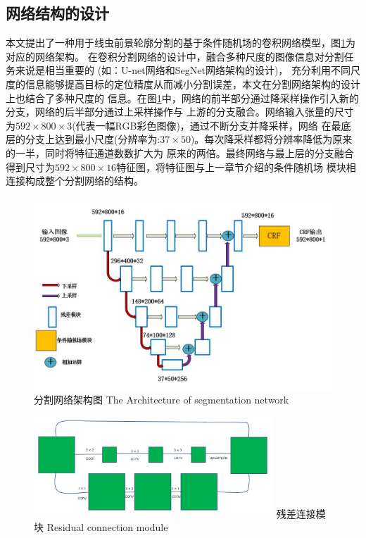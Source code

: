 \subsection{网络结构的设计}
\label{subsec:arch-design}
	本文提出了一种用于线虫前景轮廓分割的基于条件随机场的卷积网络模型，图\ref{fig:chap5:arch}为对应的网络架构。
	在卷积分割网络的设计中，融合多种尺度的图像信息对分割任务来说是相当重要的
	(如：U-net网络\cite{ronneberger2015u}和SegNet网络\cite{badrinarayanan2015segnet}架构的设计)，
	充分利用不同尺度的信息能够提高目标的定位精度从而减小分割误差，本文在分割网络架构的设计上也结合了多种尺度的
	信息。在图\ref{fig:chap5:arch}中，网络的前半部分通过降采样操作引入新的分支，网络的后半部分通过上采样操作与
	上游的分支融合。网络输入张量的尺寸为$592\times800\times3$(代表一幅RGB彩色图像)，通过不断分支并降采样，网络
	在最底层的分支上达到最小尺度(分辨率为:$37\times50$)。每次降采样都将分辨率降低为原来的一半，同时将特征通道数数扩大为
	原来的两倍。最终网络与最上层的分支融合得到尺寸为$592\times800\times16$特征图，将特征图与上一章节介绍的条件随机场
	模块相连接构成整个分割网络的结构。
	\begin{figure}[thb]
	  \centering
	  \includegraphics[width=13cm]{figure/chap5/arch.jpg}
	  \bicaption
		{分割网络架构图}
		{The Architecture of segmentation network}
	  \label{fig:chap5:arch}
	\end{figure}
	\begin{figure}[htb]
	  \centering
	  \includegraphics[width=9cm]{figure/chap4/residualpooling.jpg}
	  \bicaption
		{残差连接模块}
		{Residual connection module}
	  \label{fig:chap4:respool}
	\end{figure}
	
